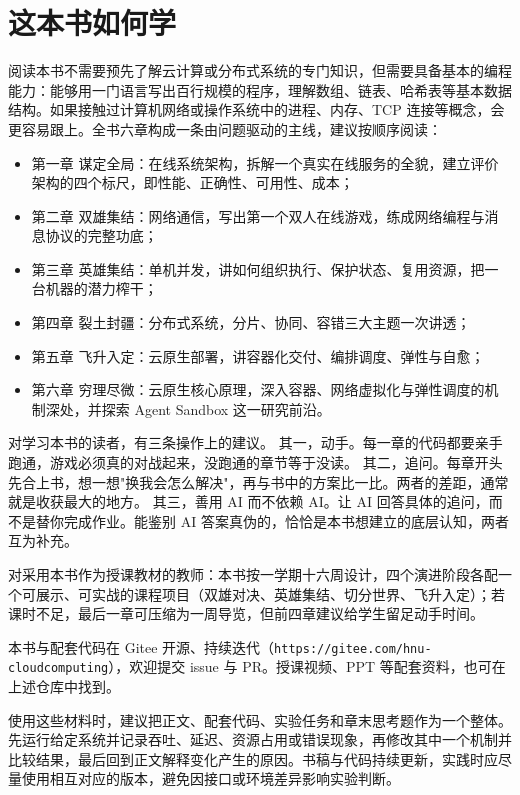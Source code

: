 \section*{这本书如何学}

阅读本书不需要预先了解云计算或分布式系统的专门知识，但需要具备基本的编程能力：能够用一门语言写出百行规模的程序，理解数组、链表、哈希表等基本数据结构。如果接触过计算机网络或操作系统中的进程、内存、TCP 连接等概念，会更容易跟上。全书六章构成一条由问题驱动的主线，建议按顺序阅读：

\begin{itemize}
    \item 第一章 谋定全局：在线系统架构，拆解一个真实在线服务的全貌，建立评价架构的四个标尺，即性能、正确性、可用性、成本；
    \item 第二章 双雄集结：网络通信，写出第一个双人在线游戏，练成网络编程与消息协议的完整功底；
    \item 第三章 英雄集结：单机并发，讲如何组织执行、保护状态、复用资源，把一台机器的潜力榨干；
    \item 第四章 裂土封疆：分布式系统，分片、协同、容错三大主题一次讲透；
    \item 第五章 飞升入定：云原生部署，讲容器化交付、编排调度、弹性与自愈；
    \item 第六章 穷理尽微：云原生核心原理，深入容器、网络虚拟化与弹性调度的机制深处，并探索 Agent Sandbox 这一研究前沿。
\end{itemize}

对学习本书的读者，有三条操作上的建议。
其一，动手。每一章的代码都要亲手跑通，游戏必须真的对战起来，没跑通的章节等于没读。
其二，追问。每章开头先合上书，想一想"换我会怎么解决"，再与书中的方案比一比。两者的差距，通常就是收获最大的地方。
其三，善用 AI 而不依赖 AI。让 AI 回答具体的追问，而不是替你完成作业。能鉴别 AI 答案真伪的，恰恰是本书想建立的底层认知，两者互为补充。

对采用本书作为授课教材的教师：本书按一学期十六周设计，四个演进阶段各配一个可展示、可实战的课程项目（双雄对决、英雄集结、切分世界、飞升入定）；若课时不足，最后一章可压缩为一周导览，但前四章建议给学生留足动手时间。

本书与配套代码在 Gitee 开源、持续迭代（\texttt{https://gitee.com/hnu-cloudcomputing}），欢迎提交 issue 与 PR。授课视频、PPT 等配套资料，也可在上述仓库中找到。

使用这些材料时，建议把正文、配套代码、实验任务和章末思考题作为一个整体。
先运行给定系统并记录吞吐、延迟、资源占用或错误现象，再修改其中一个机制并比较结果，最后回到正文解释变化产生的原因。书稿与代码持续更新，实践时应尽量使用相互对应的版本，避免因接口或环境差异影响实验判断。

